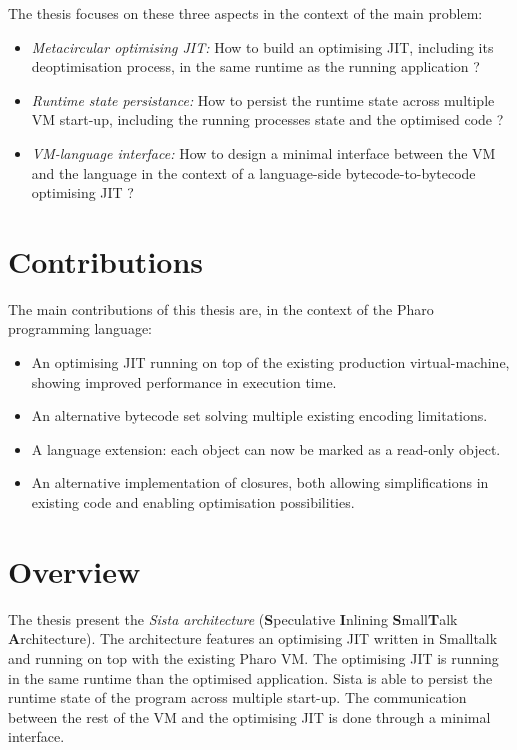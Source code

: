 \documentclass[a4paper,12pt,twoside]{../includes/ThesisStyle}
\begin{document}
The thesis focuses on these three aspects in the context of the main problem:
\begin{itemize}
	\item \emph{Metacircular optimising JIT:} How to build an optimising JIT, including its deoptimisation process, in the same runtime as the running application ?
	\item \emph{Runtime state persistance:} How to persist the runtime state across multiple VM start-up, including the running processes state and the optimised code ?
	\item \emph{VM-language interface:} How to design a minimal interface between the VM and the language in the context of a language-side bytecode-to-bytecode optimising JIT ?
\end{itemize}

\section{Contributions}

The main contributions of this thesis are, in the context of the Pharo programming language:
\begin{itemize}
	\item An optimising JIT running on top of the existing production virtual-machine, showing improved performance in execution time.
	\item An alternative bytecode set solving multiple existing encoding limitations.
	\item A language extension: each object can now be marked as a read-only object.
	\item An alternative implementation of closures, both allowing simplifications in existing code and enabling optimisation possibilities.
\end{itemize}

\section{Overview}

The thesis present the \emph{Sista architecture} (\textbf{S}peculative \textbf{I}nlining \textbf{S}mall\textbf{T}alk \textbf{A}rchitecture). The architecture features an optimising JIT written in Smalltalk and running on top with the existing Pharo VM. The optimising JIT is running in the same runtime than the optimised application. Sista is able to persist the runtime state of the program across multiple start-up. The communication between the rest of the VM and the optimising JIT is done through a minimal interface.
\end{document}
